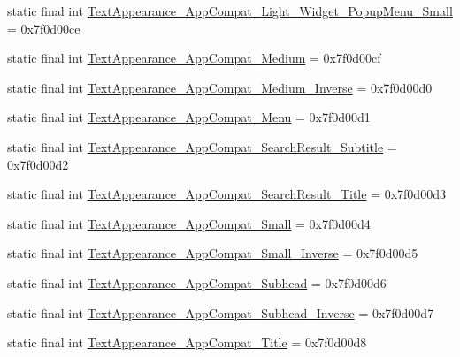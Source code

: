 \begin{DoxyCompactItemize}
\item 
static final int \mbox{\hyperlink{classandroid_1_1support_1_1design_1_1_r_1_1style_a51f65809127f437f963c959df41f55ca}{Text\+Appearance\+\_\+\+App\+Compat\+\_\+\+Light\+\_\+\+Widget\+\_\+\+Popup\+Menu\+\_\+\+Small}} = 0x7f0d00ce
\item 
static final int \mbox{\hyperlink{classandroid_1_1support_1_1design_1_1_r_1_1style_a6f36f3944c8c9e72bb28b1b6f6f55a08}{Text\+Appearance\+\_\+\+App\+Compat\+\_\+\+Medium}} = 0x7f0d00cf
\item 
static final int \mbox{\hyperlink{classandroid_1_1support_1_1design_1_1_r_1_1style_afedf82a346a4efa74ea8c629e33ca220}{Text\+Appearance\+\_\+\+App\+Compat\+\_\+\+Medium\+\_\+\+Inverse}} = 0x7f0d00d0
\item 
static final int \mbox{\hyperlink{classandroid_1_1support_1_1design_1_1_r_1_1style_ac915ed93a55ceecfd2cab0a8274bec5c}{Text\+Appearance\+\_\+\+App\+Compat\+\_\+\+Menu}} = 0x7f0d00d1
\item 
static final int \mbox{\hyperlink{classandroid_1_1support_1_1design_1_1_r_1_1style_aa74ef0db689e7a9ca4d8eb5bb6ddb39f}{Text\+Appearance\+\_\+\+App\+Compat\+\_\+\+Search\+Result\+\_\+\+Subtitle}} = 0x7f0d00d2
\item 
static final int \mbox{\hyperlink{classandroid_1_1support_1_1design_1_1_r_1_1style_ac1981951ceed0b51f02c35a709d05b59}{Text\+Appearance\+\_\+\+App\+Compat\+\_\+\+Search\+Result\+\_\+\+Title}} = 0x7f0d00d3
\item 
static final int \mbox{\hyperlink{classandroid_1_1support_1_1design_1_1_r_1_1style_ad01c4cdfcd6c9c59bf080f594be9a5fe}{Text\+Appearance\+\_\+\+App\+Compat\+\_\+\+Small}} = 0x7f0d00d4
\item 
static final int \mbox{\hyperlink{classandroid_1_1support_1_1design_1_1_r_1_1style_a51c0b2630a053741b47b8c2809e85733}{Text\+Appearance\+\_\+\+App\+Compat\+\_\+\+Small\+\_\+\+Inverse}} = 0x7f0d00d5
\item 
static final int \mbox{\hyperlink{classandroid_1_1support_1_1design_1_1_r_1_1style_aacedc78f0110a92c2c299c22125f3ef5}{Text\+Appearance\+\_\+\+App\+Compat\+\_\+\+Subhead}} = 0x7f0d00d6
\item 
static final int \mbox{\hyperlink{classandroid_1_1support_1_1design_1_1_r_1_1style_a09683f1d91752d44db1f8c8be6d4d501}{Text\+Appearance\+\_\+\+App\+Compat\+\_\+\+Subhead\+\_\+\+Inverse}} = 0x7f0d00d7
\item 
static final int \mbox{\hyperlink{classandroid_1_1support_1_1design_1_1_r_1_1style_ad05526165d88021b2df0f8928fc2ee6d}{Text\+Appearance\+\_\+\+App\+Compat\+\_\+\+Title}} = 0x7f0d00d8

\end{DoxyCompactItemize}
